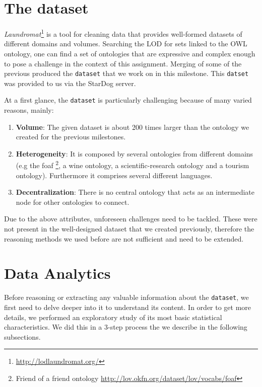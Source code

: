 \documentclass[runningheads,a4paper]{../../StyleFiles/llncs}
\begin{document}

\section{The dataset}
\textit{Laundromat}\footnote{\url{http://lodlaundromat.org/}} is a tool for cleaning data that provides well-formed datasets of different domains and volumes. Searching the LOD for sets linked to the OWL ontology, one can find a set of ontologies that are expressive and complex enough to pose a challenge in the context of this assignment. Merging of some of the previous produced the \texttt{dataset} that we work on in this milestone. This \texttt{datset} was provided to us via the StarDog server. 

At a first glance, the \texttt{dataset} is particularly challenging because of many varied reasons, mainly:

\begin{enumerate}
	\item \textbf{Volume}: The given dataset is about 200 times larger than the ontology we created for the previous milestones.
	\item \textbf{Heterogeneity}: It is composed by several ontologies from different domains (e.g the foaf \footnote{Friend of a friend ontology \url{http://lov.okfn.org/dataset/lov/vocabs/foaf}}, a wine ontology, a scientific-research ontology and a tourism ontology). Furthermore it comprises several different languages.
	\item \textbf{Decentralization}: There is no central ontology that acts as an intermediate node for other ontologies to connect.
\end{enumerate}

Due to the above attributes, unforeseen challenges need to be tackled. These were not present in the well-designed dataset that we created previously, therefore the reasoning methods we used before are not sufficient and need to be extended.

\section{Data Analytics}
Before reasoning or extracting any valuable information about the \texttt{dataset}, we first need to delve deeper into it to understand its content. In order to get more details, we performed an exploratory study of its most basic statistical characteristics. We did this in a 3-step process the we describe in the following subsections.
\end{document}
